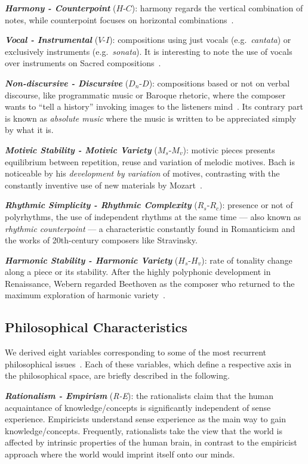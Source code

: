 \documentclass[
 aip,
 jmp,
 amsmath,amssymb,
 reprint,
]{revtex4-1}
\begin{document}
{\bf \em{ Harmony - Counterpoint}} ($H$-$C$): harmony regards the
vertical combination of notes, while counterpoint focuses on
horizontal combinations~\cite{BennettHistory}.

{\bf \em{ Vocal - Instrumental}} ($V$-$I$): compositions using just vocals
(e.g.\ \emph{cantata}) or exclusively instruments
(e.g.\ \emph{sonata}). It is interesting to note the use of
vocals over instruments on Sacred compositions~\cite{Lovelock}.

{\bf \em{ Non-discursive - Discursive}} ($D_n$-$D$): compositions
based or not
on verbal discourse, like programmatic music or Baroque rhetoric, where the composer wants
to ``tell a history'' invoking images to the listeners
mind~\cite{BennettHistory}. Its contrary part is known as
\textit{absolute music} where the music is written to be appreciated simply
by what it is.

{\bf \em{ Motivic Stability - Motivic Variety}} ($M_s$-$M_v$): motivic pieces presents equilibrium
between repetition, reuse and variation of melodic motives. Bach is noticeable by his
\textit{development by variation} of motives, contrasting with the
constantly inventive use of new materials by Mozart~\cite{Webern}.

{\bf \em{ Rhythmic Simplicity - Rhythmic Complexity}} ($R_s$-$R_c$): presence or not of polyrhythms, the
use of independent rhythms at the same time --- also known as
\textit{rhythmic counterpoint}\cite{BennettHistory} --- a characteristic
constantly found in Romanticism and the works of 20th-century composers like Stravinsky.

{\bf \em{ Harmonic Stability - Harmonic Variety}} ($H_s$-$H_v$):
rate of tonality change along a piece or its stability. After the highly
polyphonic development in Renaissance, Webern regarded Beethoven as the
composer who returned to the maximum exploration of harmonic variety~\cite{Webern}.

\subsection{Philosophical Characteristics}

We derived eight variables corresponding to some of the most recurrent
philosophical issues~\cite{Russel,Papineau,Deleuze2}.  Each of
these variables, which define a respective axis in the philosophical
space, are briefly described in the following.

{\bf \em{ Rationalism - Empirism}} (\emph{R-E}): the rationalists
claim that the human acquaintance of knowledge/concepts is
significantly independent of sense experience. Empiricists understand
sense experience as the main way to gain knowledge/concepts.
Frequently, rationalists take the view that the world is affected by
intrinsic properties of the human brain, in contrast to the empiricist
approach where the world would imprint itself onto our minds.
\end{document}

